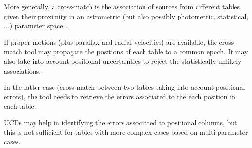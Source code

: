 More generally, a cross-match is the association of sources from different tables given their 
proximity in an astrometric (but also possibly photometric, statistical, ...) parameter
space \citep{2017A&A...597A..89P}.

If proper motions (plus parallax and radial velocities) are available, the cross-match tool 
may propagate the positions of each table to a common epoch.
It may also take into account positional uncertainties to reject the statistically unlikely associations.

In the latter case (cross-match between two tables taking into account positional errors),
the tool needs to retrieve the errors associated to the each position in each table.

UCDs may help in identifying the errors associated to positional columns, 
but this is not sufficient for tables with more complex cases based on multi-parameter cases.
